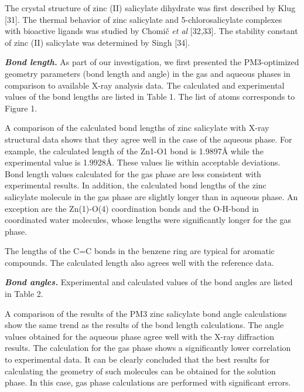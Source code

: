 \begin{multicols}{2}
The crystal structure of zinc (II) salicylate dihydrate was first
described by Klug {[}31{]}. The thermal behavior of zinc salicylate and
5-chlorosalicylate complexes with bioactive ligands was studied by
Chomič \emph{et al} {[}32,33{]}\emph{.} The stability constant of zinc
(II) salicylate was determined by Singh {[}34{]}.

{\bfseries \emph{Bond length.}} As part of our investigation, we first
presented the PM3-optimized geometry parameters (bond length and angle)
in the gas and aqueous phases in comparison to available X-ray analysis
data. The calculated and experimental values \hspace{0pt}\hspace{0pt}of
the bond lengths are listed in Table 1. The list of atoms corresponds to
Figure 1.

A comparison of the calculated bond lengths of zinc salicylate with
X-ray structural data shows that they agree well in the case of the
aqueous phase. For example, the calculated length of the Zn1-O1 bond is
1.9897Å while the experimental value is 1.9928Å. These values lie within
acceptable deviations. Bond length values
\hspace{0pt}\hspace{0pt}calculated for the gas phase are less consistent
with experimental results. In addition, the calculated bond lengths of
the zinc salicylate molecule in the gas phase are slightly longer than
in aqueous phase. An exception are the Zn(1)-O(4) coordination bonds and
the O-H-bond in coordinated water molecules, whose lengths were
significantly longer for the gas phase.

The lengths of the C=C bonds in the benzene ring are typical for
aromatic compounds. The calculated length also agrees well with the
reference data.

{\bfseries \emph{Bond angles.}} Experimental and calculated values of the
bond angles are listed in Table 2.

A comparison of the results of the PM3 zinc salicylate bond angle
calculations show the same trend as the results of the bond length
calculations. The angle values \hspace{0pt}\hspace{0pt}obtained for the
aqueous phase agree well with the X-ray diffraction results. The
calculation for the gas phase shows a significantly lower correlation to
experimental data. It can be clearly concluded that the best results for
calculating the geometry of such molecules can be obtained for the
solution phase. In this case, gas phase calculations are performed with
significant errors.
\end{multicols}

